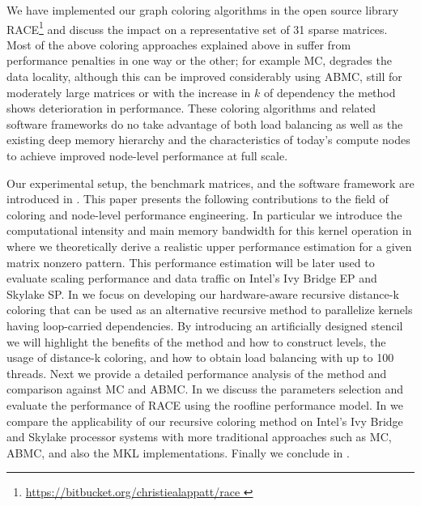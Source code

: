 We have implemented our graph coloring algorithms in the open source library \acrfull{RACE}\footnote{\href{https://bitbucket.org/christiealappatt/race}{https://bitbucket.org/christiealappatt/race }} and discuss the impact on a representative set of 31 sparse matrices. Most of the above coloring approaches explained above in  suffer from performance penalties in one way or the other; for example \acrshort{MC}, degrades the data locality, although this can be improved considerably using \acrshort{ABMC}, still for moderately large matrices or with the increase in $k$ of \DK dependency the method shows deterioration in performance. 
These coloring algorithms and related software frameworks do no take advantage of both load balancing as well as the existing deep memory hierarchy and the characteristics of today's compute nodes to achieve improved node-level performance at full scale.

Our experimental setup, the benchmark matrices, and the software framework are introduced in .
This paper presents the following contributions to the field of coloring and node-level performance engineering. In particular we introduce the computational intensity and main memory bandwidth for this kernel operation in  where we theoretically derive a realistic upper performance estimation for a given matrix nonzero pattern.  This performance estimation will be later used to evaluate scaling performance and data traffic on Intel's Ivy Bridge EP and Skylake SP. In  we focus on developing our hardware-aware recursive distance-k coloring that can be used as an alternative recursive method to parallelize kernels having loop-carried dependencies. By introducing an artificially designed stencil we will highlight the benefits of the method and how to construct levels, the usage of distance-k coloring, and how to obtain load balancing with up to 100 threads. Next we provide a detailed performance analysis of the method and comparison against \acrshort{MC} and \acrshort{ABMC}. In  we discuss the parameters selection and evaluate the performance of \acrshort{RACE} using the roofline performance model. In  we compare the applicability of our recursive coloring method on Intel's Ivy Bridge and Skylake processor systems with more traditional approaches such as  \acrshort{MC}, \acrshort{ABMC}, and also the \acrshort{MKL} implementations. Finally we conclude in 
.


